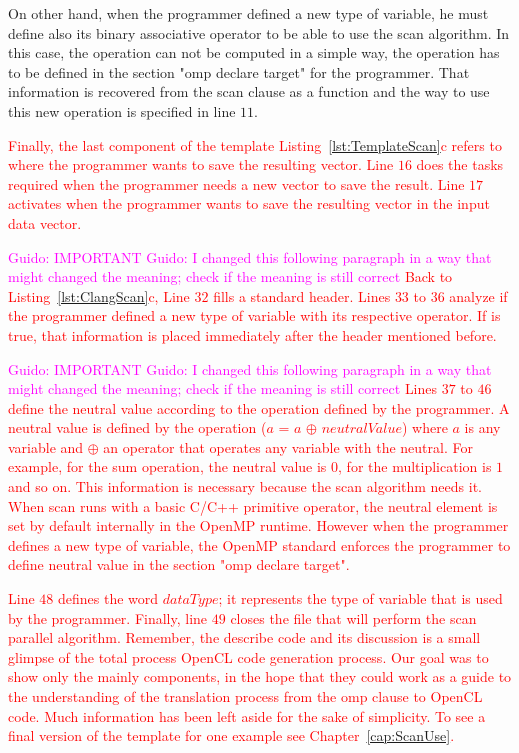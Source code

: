 \documentclass[Ingles]{ic-tese-v1}
\newcommand{\guido}[1]{\noindent\textcolor{magenta}{Guido: {#1}}}
\newcommand{\ed}[1]{\noindent\textcolor{red}{ {#1}}}
\newcommand{\guido}[1]{}
\newcommand{\ed}[1]{}
\newcommand{\rcap}[1]{Chapter~\ref{cap:#1}}
\newcommand{\rlst}[1]{Listing~\ref{lst:#1}}
\begin{document}
On other hand, when the programmer defined a new type of variable, he must
define also its binary associative operator to be able to use the scan
algorithm. In this case, the operation can not be computed in a simple way, the
operation has to be defined in the section "omp declare target" for the
programmer. That information is recovered from the scan clause as a function
and the way to use this new operation is specified in line $11$.

\ed{Finally, the last component of the template \rlst{TemplateScan}{c} refers to
where the programmer wants to save the resulting vector. Line $16$ does the  tasks
required  when the programmer needs a new vector to save the result. Line $17$ activates when
the programmer wants to save the resulting vector in the input data vector.}

\guido{IMPORTANT}
\guido{I changed this following paragraph in a way that might changed the meaning; check if the meaning is still correct}
\ed{Back to \rlst{ClangScan}{c}, Line $32$ fills a standard header. Lines $33$
to $36$ analyze if the programmer defined a new type of variable with its
respective operator. If is true, that information is placed immediately after
the header mentioned before.}

\guido{IMPORTANT}
\guido{I changed this following paragraph in a way that might changed the meaning; check if the meaning is still correct}
\ed{Lines $37$ to $46$ define the neutral value according to the operation defined by the programmer.
A neutral value is defined by the operation ($a$ = $a$ $\oplus$ $neutralValue$)
where $a$ is any variable and $\oplus$ an operator that 
operates any variable with the neutral. For example, for the sum operation, the
neutral value is $0$, for the multiplication is $1$ and so on. This information
is necessary because the scan algorithm needs it. When scan runs  with a basic C/C++
primitive  operator, the neutral  element is set by default internally in the OpenMP runtime. However when
the programmer defines a new type of variable, the OpenMP standard enforces  the programmer  to define
neutral value in the section "omp declare target".}

\ed{Line $48$ defines the word $dataType$; it represents the type of variable that
is used by the programmer. Finally, line $49$ closes the file that will
perform the scan parallel algorithm. Remember, the describe code and its  discussion  is a small
glimpse of the total process OpenCL code generation process. Our goal was to show
only the mainly components, in the hope that they could work as a guide to the  
understanding of the translation process from the omp clause
to OpenCL code. Much information has been left aside for the sake of simplicity.
To see a final version of the template for one example see \rcap{ScanUse}.}
\end{document}
